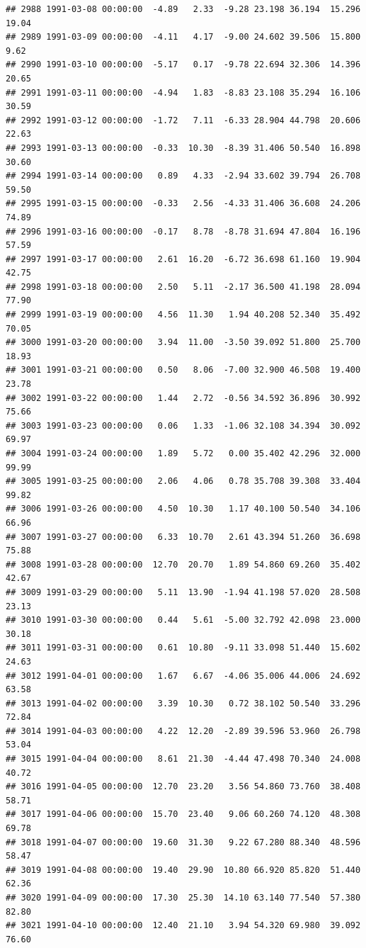 \documentclass{article}\usepackage{graphicx, color}
\makeatletter
\newenvironment{kframe}{%
 \def\at@end@of@kframe{}%
 \ifinner\ifhmode%
  \def\at@end@of@kframe{\end{minipage}}%
  \begin{minipage}{\columnwidth}%
 \fi\fi%
 \def\FrameCommand##1{\hskip\@totalleftmargin \hskip-\fboxsep
 \colorbox{shadecolor}{##1}\hskip-\fboxsep
     \hskip-\linewidth \hskip-\@totalleftmargin \hskip\columnwidth}%
 \MakeFramed {\advance\hsize-\width
   \@totalleftmargin\z@ \linewidth\hsize
   \@setminipage}}%
 {\par\unskip\endMakeFramed%
 \at@end@of@kframe}
\newenvironment{knitrout}{}{} %
\makeatother
\begin{document}
\begin{knitrout}
\begin{kframe}
\begin{verbatim}
## 2988 1991-03-08 00:00:00  -4.89   2.33  -9.28 23.198 36.194  15.296  19.04
## 2989 1991-03-09 00:00:00  -4.11   4.17  -9.00 24.602 39.506  15.800   9.62
## 2990 1991-03-10 00:00:00  -5.17   0.17  -9.78 22.694 32.306  14.396  20.65
## 2991 1991-03-11 00:00:00  -4.94   1.83  -8.83 23.108 35.294  16.106  30.59
## 2992 1991-03-12 00:00:00  -1.72   7.11  -6.33 28.904 44.798  20.606  22.63
## 2993 1991-03-13 00:00:00  -0.33  10.30  -8.39 31.406 50.540  16.898  30.60
## 2994 1991-03-14 00:00:00   0.89   4.33  -2.94 33.602 39.794  26.708  59.50
## 2995 1991-03-15 00:00:00  -0.33   2.56  -4.33 31.406 36.608  24.206  74.89
## 2996 1991-03-16 00:00:00  -0.17   8.78  -8.78 31.694 47.804  16.196  57.59
## 2997 1991-03-17 00:00:00   2.61  16.20  -6.72 36.698 61.160  19.904  42.75
## 2998 1991-03-18 00:00:00   2.50   5.11  -2.17 36.500 41.198  28.094  77.90
## 2999 1991-03-19 00:00:00   4.56  11.30   1.94 40.208 52.340  35.492  70.05
## 3000 1991-03-20 00:00:00   3.94  11.00  -3.50 39.092 51.800  25.700  18.93
## 3001 1991-03-21 00:00:00   0.50   8.06  -7.00 32.900 46.508  19.400  23.78
## 3002 1991-03-22 00:00:00   1.44   2.72  -0.56 34.592 36.896  30.992  75.66
## 3003 1991-03-23 00:00:00   0.06   1.33  -1.06 32.108 34.394  30.092  69.97
## 3004 1991-03-24 00:00:00   1.89   5.72   0.00 35.402 42.296  32.000  99.99
## 3005 1991-03-25 00:00:00   2.06   4.06   0.78 35.708 39.308  33.404  99.82
## 3006 1991-03-26 00:00:00   4.50  10.30   1.17 40.100 50.540  34.106  66.96
## 3007 1991-03-27 00:00:00   6.33  10.70   2.61 43.394 51.260  36.698  75.88
## 3008 1991-03-28 00:00:00  12.70  20.70   1.89 54.860 69.260  35.402  42.67
## 3009 1991-03-29 00:00:00   5.11  13.90  -1.94 41.198 57.020  28.508  23.13
## 3010 1991-03-30 00:00:00   0.44   5.61  -5.00 32.792 42.098  23.000  30.18
## 3011 1991-03-31 00:00:00   0.61  10.80  -9.11 33.098 51.440  15.602  24.63
## 3012 1991-04-01 00:00:00   1.67   6.67  -4.06 35.006 44.006  24.692  63.58
## 3013 1991-04-02 00:00:00   3.39  10.30   0.72 38.102 50.540  33.296  72.84
## 3014 1991-04-03 00:00:00   4.22  12.20  -2.89 39.596 53.960  26.798  53.04
## 3015 1991-04-04 00:00:00   8.61  21.30  -4.44 47.498 70.340  24.008  40.72
## 3016 1991-04-05 00:00:00  12.70  23.20   3.56 54.860 73.760  38.408  58.71
## 3017 1991-04-06 00:00:00  15.70  23.40   9.06 60.260 74.120  48.308  69.78
## 3018 1991-04-07 00:00:00  19.60  31.30   9.22 67.280 88.340  48.596  58.47
## 3019 1991-04-08 00:00:00  19.40  29.90  10.80 66.920 85.820  51.440  62.36
## 3020 1991-04-09 00:00:00  17.30  25.30  14.10 63.140 77.540  57.380  82.80
## 3021 1991-04-10 00:00:00  12.40  21.10   3.94 54.320 69.980  39.092  76.60

\end{verbatim}
\end{kframe}
\end{knitrout}
\end{document}
